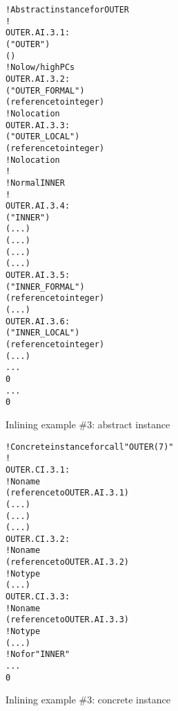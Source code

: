 \begin{figure}[t]
\begin{dwflisting}
\begin{alltt}
    ! Abstract instance for OUTER
    ! 
OUTER.AI.3.1:
    \DWTAGsubprogram
        \DWATname("OUTER")
        \DWATinline(\DWINLdeclaredinlined)
        ! No low/high PCs
OUTER.AI.3.2:
        \DWTAGformalparameter
            \DWATname("OUTER\_FORMAL")
            \DWATtype(reference to integer)
            ! No location
OUTER.AI.3.3:
        \DWTAGvariable
            \DWATname("OUTER\_LOCAL")
            \DWATtype(reference to integer)
            ! No location
        !
        ! Normal INNER
        !
OUTER.AI.3.4:
        \DWTAGsubprogram
            \DWATname("INNER")
            \DWATlowpc(...)
            \DWAThighpc(...)
            \DWATframebase(...)
            \DWATstaticlink(...)
OUTER.AI.3.5:
            \DWTAGformalparameter
                \DWATname("INNER\_FORMAL")
                \DWATtype(reference to integer)
                \DWATlocation(...)
OUTER.AI.3.6:
            \DWTAGvariable
                \DWATname("INNER\_LOCAL")
                \DWATtype(reference to integer)
                \DWATlocation(...)
            ...
            0
        ...
        0
\end{alltt}
\end{dwflisting}
\caption{Inlining example \#3: abstract instance}
\label{fig:inliningexample3abstractinstance}
\end{figure}

\begin{figure}[t]
\begin{dwflisting}
\begin{alltt}
    ! Concrete instance for call "OUTER(7)"
    ! 
OUTER.CI.3.1:
    \DWTAGinlinedsubroutine
        ! No name
        \DWATabstractorigin(reference to OUTER.AI.3.1)
        \DWATlowpc(...)
        \DWAThighpc(...)
        \DWATframebase(...)
OUTER.CI.3.2:
        \DWTAGformalparameter
            ! No name
            \DWATabstractorigin(reference to OUTER.AI.3.2)
            ! No type
            \DWATlocation(...)
OUTER.CI.3.3:
        \DWTAGvariable
            ! No name
            \DWATabstractorigin(reference to OUTER.AI.3.3)
            ! No type
            \DWATlocation(...)
        ! No \DWTAGsubprogram for "INNER"
        ...
        0
\end{alltt}
\end{dwflisting}
\caption{Inlining example \#3: concrete instance}
\label{fig:inliningexample3concreteinstance}
\end{figure}

